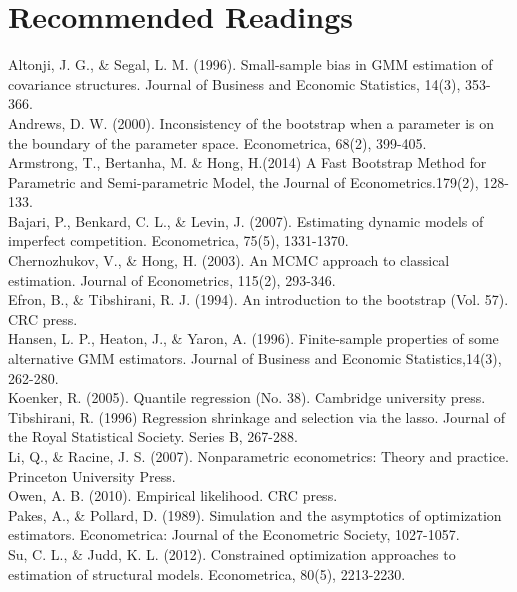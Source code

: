 \documentclass[11pt]{article}
\begin{document}
\section{Recommended Readings}
Altonji, J. G., \& Segal, L. M. (1996). Small-sample bias in GMM estimation of covariance structures. Journal of Business and Economic Statistics, 14(3), 353-366. \\
Andrews, D. W. (2000). Inconsistency of the bootstrap when a parameter is on the boundary of the parameter space. Econometrica, 68(2), 399-405. \\
Armstrong, T., Bertanha, M. \& Hong, H.(2014) A Fast Bootstrap Method for Parametric and Semi-parametric Model, the Journal of Econometrics.179(2), 128-133. \\
Bajari, P., Benkard, C. L., \& Levin, J. (2007). Estimating dynamic models of imperfect competition. Econometrica, 75(5), 1331-1370. \\
Chernozhukov, V., \& Hong, H. (2003). An MCMC approach to classical estimation. Journal of Econometrics, 115(2), 293-346. \\
Efron, B., \& Tibshirani, R. J. (1994). An introduction to the bootstrap (Vol. 57). CRC press. \\
Hansen, L. P., Heaton, J., \& Yaron, A. (1996). Finite-sample properties of some alternative GMM estimators. Journal of Business and Economic Statistics,14(3), 262-280. \\
Koenker, R. (2005). Quantile regression (No. 38). Cambridge university press. \\
Tibshirani, R. (1996) Regression shrinkage and selection via the lasso. Journal of the Royal Statistical Society. Series B, 267-288. \\
Li, Q., \& Racine, J. S. (2007). Nonparametric econometrics: Theory and practice. Princeton University Press. \\
Owen, A. B. (2010). Empirical likelihood. CRC press. \\
Pakes, A., \& Pollard, D. (1989). Simulation and the asymptotics of optimization estimators. Econometrica: Journal of the Econometric Society, 1027-1057. \\
Su, C. L., \& Judd, K. L. (2012). Constrained optimization approaches to estimation of structural models. Econometrica, 80(5), 2213-2230.
\end{document}
